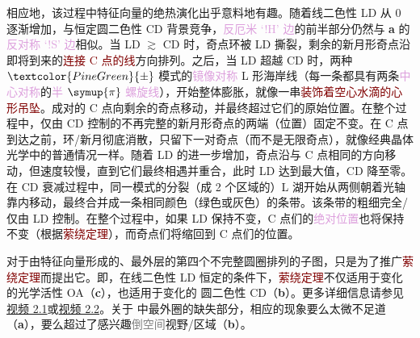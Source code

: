 相应地，该过程中\textcolor{PineGreen}{特征向量}的\textcolor{NavyBlue}{绝热演化}出乎意料地有趣。随着\textcolor{NavyBlue}{线二色性 LD} 从 0 逐渐增加，与恒定\textcolor{NavyBlue}{圆二色性 CD} 背景竞争，\textcolor{Plum}{反厄米 `!H' 边}的前半部分仍然与 \textbf{a} 的 \textcolor{Plum}{反对称 `!S' 边}相似。当 \textcolor{NavyBlue}{LD} $\gtrsim$ \textcolor{NavyBlue}{CD} 时，\textcolor{PineGreen}{奇点环}被 \textcolor{NavyBlue}{LD} 撕裂，剩余的\textcolor{PineGreen}{新月形奇点}沿即将到来的\textcolor{Maroon}{连接 C 点的线}方向排列。之后，当 \textcolor{NavyBlue}{LD} 超越 \textcolor{NavyBlue}{CD} 时，两种 $\textcolor{PineGreen}{\pm}$ \textcolor{PineGreen}{模式}的\textcolor{Plum}{镜像对称} \textcolor{PineGreen}{L 形海岸线}（每一条都具有两条\textcolor{Plum}{中心对称}的\textcolor{Plum}{半 $\symup{\pi}$ 螺旋线}），开始整体膨胀，就像一串\textcolor{Maroon}{装饰着空心水滴的心形吊坠}。成对的 \textcolor{PineGreen}{C 点}向剩余的\textcolor{PineGreen}{奇点}移动，并最终超过它们的原始位置。在整个过程中，仅由 \textcolor{NavyBlue}{CD} 控制的不再完整的\textcolor{PineGreen}{新月形奇点}的两端（位置）固定不变。在 \textcolor{PineGreen}{C 点}到达之前，\textcolor{PineGreen}{环}/\textcolor{PineGreen}{新月}彻底消散，只留下\textcolor{PineGreen}{一对奇点}（而不是\textcolor{PineGreen}{无限奇点}），就像经典\textcolor{PineGreen}{晶体光学}中的普通情况一样。随着 \textcolor{NavyBlue}{LD} 的进一步增加，\textcolor{PineGreen}{奇点}沿与 \textcolor{PineGreen}{C 点}相同的方向移动，但速度较慢，直到它们最终相遇并重合，此时 \textcolor{NavyBlue}{LD} 达到最大值，\textcolor{NavyBlue}{CD} 降至零。在 \textcolor{NavyBlue}{CD} \textcolor{NavyBlue}{衰减}过程中，同一\textcolor{PineGreen}{模式}的\textcolor{PineGreen}{分裂（成 2 个区域的）L 湖}开始从两侧朝着\textcolor{PineGreen}{光轴}靠内移动，最终合并成一条相同颜色（绿色或灰色）的条带。该条带的粗细完全/仅由 \textcolor{NavyBlue}{LD} 控制。在整个过程中，如果 \textcolor{NavyBlue}{LD} 保持不变，\textcolor{PineGreen}{C 点们}的\textcolor{Plum}{绝对位置}也将保持不变（根据\textcolor{Maroon}{萦绕定理}\cite{berryOpticalSingularitiesBirefringent2003}），而\textcolor{PineGreen}{奇点们}将缩回到 \textcolor{PineGreen}{C 点们}的位置。

对于由\textcolor{PineGreen}{特征向量}形成的、最外层的第四个不完整圆圈排列的子图，只是为了推广\textcolor{Maroon}{萦绕定理}而提出它。即，在\textcolor{NavyBlue}{线二色性 LD} 恒定的条件下，\textcolor{Maroon}{萦绕定理}不仅适用于变化的\textcolor{NavyBlue}{光学活性 OA}（\textbf{c}），也适用于变化的 \textcolor{NavyBlue}{圆二色性 CD}（\textbf{b}）。更多详细信息请参见\href{https://www.youtube.com/watch?v=xkMWXW29HYc}{视频 2.1}或\href{https://www.youtube.com/watch?v=PPZHhTvdfb0}{视频 2.2}。关于 中最外圈的缺失部分，相应的现象要么太微不足道（\textbf{a}），要么超过了感兴趣\textcolor{gray}{倒空间}视野/区域（\textbf{b}）。

